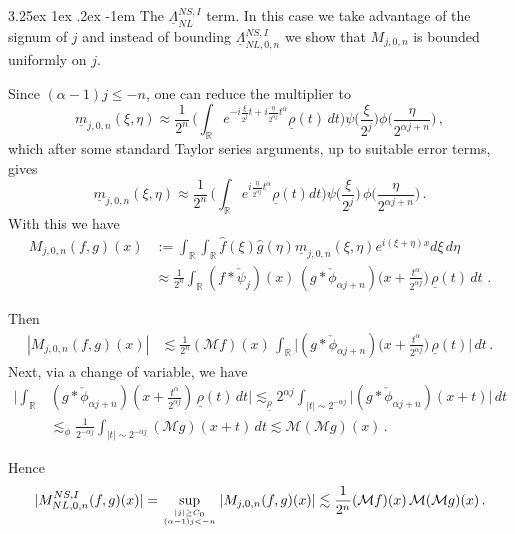 \documentclass[a4paper,reqno]{amsart}
\makeatletter
\renewcommand\paragraph{\@startsection{paragraph}{4}{\z@}%
	{3.25ex \@plus1ex \@minus.2ex}%
	{-1em}%
	{\normalfont\normalsize\bfseries}}
\numberwithin{equation}{section}
\theoremstyle{definition}
\newcommand{\R}{\mathbb{R}}
\newcommand{\um}{\underline{m}}
\newcommand{\urho}{\underline{\rho}}
\newcommand{\uL}{\underline{\Lambda}}
\def\a{\alpha}
\def\M{\mathcal{M}}
\makeatother
\begin{document}
\paragraph{The $\uL^{NS,I}_{NL}$ term.}
In this case we take advantage of the signum of $j$ and instead of bounding $\uL_{NL,0,n}^{NS,I}$ we show that $M_{j,0,n}$ is bounded uniformly on $j$.

Since $(\a-1)j\le -n$, one can reduce the multiplier to
\begin{equation}
	\um_{j,0,n}(\xi,\eta)\approx\frac{1}{2^n}\,\Big(\int_\R e^{-i\frac{\xi}{2^j}t+i\frac{\eta}{2^{\a j}}t^\a}\urho(t)\,dt\Big)\psi\Big(\frac{\xi}{2^j}\Big)\phi\Big(\frac{\eta}{2^{\a j+n}}\Big)\,,
\end{equation}
which after some standard Taylor series arguments, up to suitable error terms, gives
\begin{equation}
	\um_{j,0,n}(\xi,\eta)\approx\frac{1}{2^n}\,\Big(\int_\R e^{i\frac{\eta}{2^{\a j}}t^\a}\urho(t)dt\Big) \psi\Big(\frac{\xi}{2^j}\Big)\,\phi\Big(\frac{\eta}{2^{\a j+n}}\Big)\,.
\end{equation}
With this we have
\begin{align}
	M_{j,0,n}(f,g)(x)&:=\int_\R\int_\R \hat{f}(\xi)\hat{g}(\eta)\um_{j,0,n}(\xi,\eta)e^{i(\xi+\eta)x}d\xi\, d\eta\\
	&\approx\frac1{2^n}
	\int_\R (f*\check{\psi}_j)(x)\,(g*\check{\phi}_{\a j+n})\Big(x+\frac{t^\a}{2^{\a j}}\Big)\,\urho(t)\,dt\,\nonumber\,.
\end{align}

Then
\begin{align}
	|M_{j,0,n}(f,g)(x)|&\lesssim\frac1{2^n}	(\M f)(x)\,
	\int_\R \Big|(g*\check{\phi}_{\a j+n})\Big(x+\frac{t^\a}{2^{\a j}}\Big)\,\urho(t)\Big|\,dt\,.
\end{align}
Next, via a change of variable, we have
\begin{align}
	\Big|\int_\R &(g*\check{\phi}_{\a j+n})(x+\frac{t^\a}{2^{\a j}}) \,\urho(t)\,dt\Big|\lesssim_{\urho} 2^{\a j}
	\int_{|t|\sim 2^{-\a j}} \big|(g*\check{\phi}_{\a j+n}) (x+t)\big|\,dt\nonumber\\[1ex]
	&\lesssim_\phi \frac1{2^{-\a j}} \int_{|t|\sim 2^{-\a j}}
	(\M g)(x+t)\,dt\lesssim \M(\M g)(x)\,.
\end{align}

Hence
\begin{align*}
	|M^{NS,I}_{NL,0,n}(f,g)(x)|=\sup_{{|j|\geq C_0}\atop{(\a-1)j<-n}} |M_{j,0,n}(f,g)(x)| \lesssim\frac1{2^n}	(\M f)(x)\,\M(\M g)(x)\,.
\end{align*}
\end{document}
